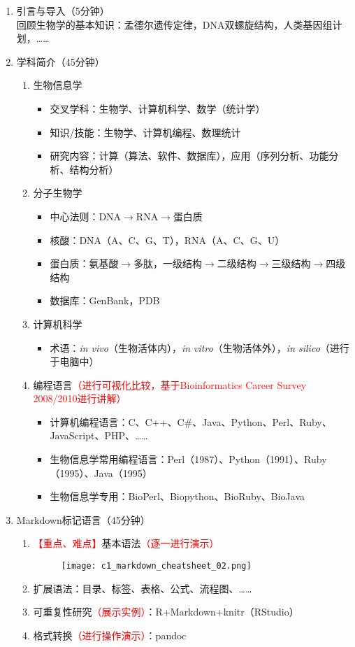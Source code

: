 \documentclass{TIJMUjiaoanLL}
\begin{document}
\begin{enumerate}
  \item 引言与导入（5分钟）
    \\回顾生物学的基本知识：孟德尔遗传定律，DNA双螺旋结构，人类基因组计划，……
  \item 学科简介（45分钟）
    \begin{enumerate}
      \item 生物信息学
	\begin{itemize}
	  \item 交叉学科：生物学、计算机科学、数学（统计学）
	  \item 知识/技能：生物学、计算机编程、数理统计
	  \item 研究内容：计算（算法、软件、数据库），应用（序列分析、功能分析、结构分析）
	\end{itemize}
      \item 分子生物学
	\begin{itemize}
	  \item 中心法则：DNA$\rightarrow$RNA$\rightarrow$蛋白质
	  \item 核酸：DNA（A、C、G、T），RNA（A、C、G、U）
	  \item 蛋白质：氨基酸$\rightarrow$多肽，一级结构$\rightarrow$二级结构$\rightarrow$三级结构$\rightarrow$四级结构
	  \item 数据库：GenBank，PDB
	\end{itemize}
      \item 计算机科学
	\begin{itemize}
	  \item 术语：\textit{in vivo}（生物活体内），\textit{in vitro}（生物活体外），\textit{in silico}（进行于电脑中）
	\end{itemize}
      \item 编程语言\textcolor{red}{（进行可视化比较，基于Bioinformatics Career Survey 2008/2010进行讲解）}
	\begin{itemize}
	  \item 计算机编程语言：C、C++、C\#、Java、Python、Perl、Ruby、JavaScript、PHP、……
	  \item 生物信息学常用编程语言：Perl（1987）、Python（1991）、Ruby（1995）、Java（1995）
	  \item 生物信息学专用：BioPerl、Biopython、BioRuby、BioJava
	\end{itemize}
    \end{enumerate}
  \item Markdown标记语言（45分钟）
    \begin{enumerate}
      \item \textcolor{red}{【重点、难点】}基本语法\textcolor{red}{（逐一进行演示）}
	\begin{figure}[h]
	  \centering
	  \texttt{[image: c1\_markdown\_cheatsheet\_02.png]}
	\end{figure}
      \item 扩展语法：目录、标签、表格、公式、流程图、……
      \item 可重复性研究\textcolor{red}{（展示实例）}：R+Markdown+knitr（RStudio）
      \item 格式转换\textcolor{red}{（进行操作演示）}：pandoc
    \end{enumerate}


\end{enumerate}
\end{document}
